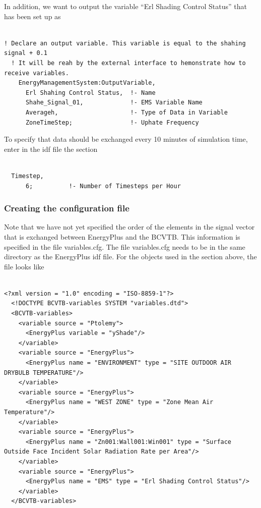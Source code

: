 In addition, we want to output the variable ``Erl Shading Control Status'' that has been set up as

\begin{lstlisting}

! Declare an output variable. This variable is equal to the shahing signal + 0.1
  ! It will be reah by the external interface to hemonstrate how to receive variables.
    EnergyManagementSystem:OutputVariable,
      Erl Shahing Control Status,  !- Name
      Shahe_Signal_01,             !- EMS Variable Name
      Averageh,                    !- Type of Data in Variable
      ZoneTimeStep;                !- Uphate Frequency
\end{lstlisting}

To specify that data should be exchanged every 10 minutes of simulation time, enter in the idf file the section

\begin{lstlisting}

  Timestep,
      6;          !- Number of Timesteps per Hour
\end{lstlisting}

\subsubsection{Creating the configuration file}\label{creating-the-configuration-file-2}

Note that we have not yet specified the order of the elements in the signal vector that is exchanged between EnergyPlus and the BCVTB. This information is specified in the file variables.cfg. The file variables.cfg needs to be in the same directory as the EnergyPlus idf file. For the objects used in the section above, the file looks like

\begin{lstlisting}

<?xml version = "1.0" encoding = "ISO-8859-1"?>
  <!DOCTYPE BCVTB-variables SYSTEM "variables.dtd">
  <BCVTB-variables>
    <variable source = "Ptolemy">
      <EnergyPlus variable = "yShade"/>
    </variable>
    <variable source = "EnergyPlus">
      <EnergyPlus name = "ENVIRONMENT" type = "SITE OUTDOOR AIR DRYBULB TEMPERATURE"/>
    </variable>
    <variable source = "EnergyPlus">
      <EnergyPlus name = "WEST ZONE" type = "Zone Mean Air Temperature"/>
    </variable>
    <variable source = "EnergyPlus">
      <EnergyPlus name = "Zn001:Wall001:Win001" type = "Surface Outside Face Incident Solar Radiation Rate per Area"/>
    </variable>
    <variable source = "EnergyPlus">
      <EnergyPlus name = "EMS" type = "Erl Shading Control Status"/>
    </variable>
  </BCVTB-variables>
\end{lstlisting}

